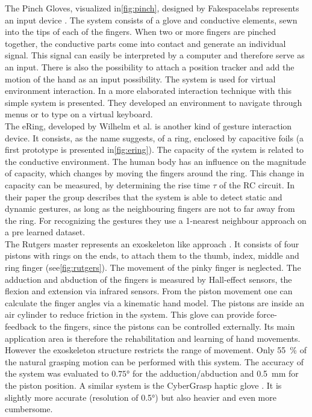 The Pinch Gloves, visualized in\ref{fig:pinch}, designed by Fakespacelabs represents an input device \cite{bowman2001using}. The system consists of a glove and conductive elements, sewn into the tips of each of the fingers. When two or more fingers are pinched together, the conductive parts come into contact and generate an individual signal. This signal can easily be interpreted by a computer and therefore serve as an input. There is also the possibility to attach a position tracker and add the motion of the hand as an input possibility. The system is used for virtual environment interaction. In \cite{bowman2001using} a more elaborated interaction technique with this simple system is presented. They developed an environment to navigate through menus or to type on a virtual keyboard.\\
The eRing, developed by Wilhelm et al. is another kind of gesture interaction device. It consists, as the name suggests, of a ring, enclosed by capacitive foils (a first prototype is presented in\ref{fig:ering}). The capacity of the system is related to the conductive environment. The human body has an influence on the magnitude of capacity, which changes by moving the fingers around the ring. This change in capacity can be measured, by determining the rise time $ \tau $ of the RC circuit. In their paper the group describes that the system is able to detect static and dynamic gestures, as long as the neighbouring fingers are not to far away from the ring. For recognizing the gestures they use a 1-nearest neighbour approach on a pre learned dataset.\\
The Rutgers master  represents an exoskeleton like approach \cite{bouzit2002rutgers}. It consists of four pistons with rings on the ends, to attach them to the thumb, index, middle and ring finger (see\ref{fig:rutgers}). The movement of the pinky finger is neglected. The adduction and abduction of the fingers is measured by Hall-effect sensors, the flexion and extension via infrared sensors. From the piston movement one can calculate the finger angles via a kinematic hand model. The pistons are inside an air cylinder to reduce friction in the system. This glove can provide force-feedback to the fingers, since the pistons can be controlled externally. Its main application area is therefore the rehabilitation and learning of hand movements. However the exoskeleton structure restricts the range of movement. Only \SI{55}{\percent} of the natural grasping motion can be performed with this system. The accuracy of the system was evaluated to $ \ang{0.75} $ for the adduction/abduction and \SI{0.5}{mm} for the piston position. A similar system is the CyberGrasp haptic glove \cite{cyberglove}. It is slightly more accurate (resolution of \ang{0.5}) but also heavier and even more cumbersome.\\
